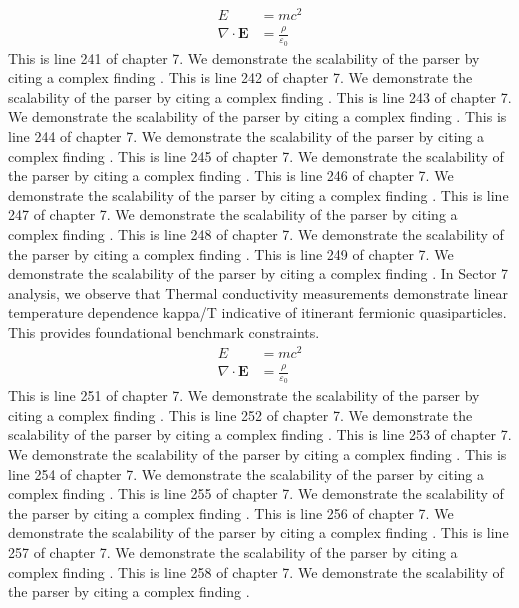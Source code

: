\begin{align*}
  E &= mc^2 \\
  \nabla \cdot \mathbf{E} &= \frac{\rho}{\varepsilon_0}
\end{align*}
This is line 241 of chapter 7. We demonstrate the scalability of the parser by citing a complex finding \cite{ref7_241}.
This is line 242 of chapter 7. We demonstrate the scalability of the parser by citing a complex finding \cite{ref7_242}.
This is line 243 of chapter 7. We demonstrate the scalability of the parser by citing a complex finding \cite{ref7_243}.
This is line 244 of chapter 7. We demonstrate the scalability of the parser by citing a complex finding \cite{ref7_244}.
This is line 245 of chapter 7. We demonstrate the scalability of the parser by citing a complex finding \cite{ref7_245}.
This is line 246 of chapter 7. We demonstrate the scalability of the parser by citing a complex finding \cite{ref7_246}.
This is line 247 of chapter 7. We demonstrate the scalability of the parser by citing a complex finding \cite{ref7_247}.
This is line 248 of chapter 7. We demonstrate the scalability of the parser by citing a complex finding \cite{ref7_248}.
This is line 249 of chapter 7. We demonstrate the scalability of the parser by citing a complex finding \cite{ref7_249}.
In Sector 7 analysis, we observe that Thermal conductivity measurements demonstrate linear temperature dependence kappa/T indicative of itinerant fermionic quasiparticles. This provides foundational benchmark constraints.
\begin{align*}
  E &= mc^2 \\
  \nabla \cdot \mathbf{E} &= \frac{\rho}{\varepsilon_0}
\end{align*}
This is line 251 of chapter 7. We demonstrate the scalability of the parser by citing a complex finding \cite{ref7_251}.
This is line 252 of chapter 7. We demonstrate the scalability of the parser by citing a complex finding \cite{ref7_252}.
This is line 253 of chapter 7. We demonstrate the scalability of the parser by citing a complex finding \cite{ref7_253}.
This is line 254 of chapter 7. We demonstrate the scalability of the parser by citing a complex finding \cite{ref7_254}.
This is line 255 of chapter 7. We demonstrate the scalability of the parser by citing a complex finding \cite{ref7_255}.
This is line 256 of chapter 7. We demonstrate the scalability of the parser by citing a complex finding \cite{ref7_256}.
This is line 257 of chapter 7. We demonstrate the scalability of the parser by citing a complex finding \cite{ref7_257}.
This is line 258 of chapter 7. We demonstrate the scalability of the parser by citing a complex finding \cite{ref7_258}.
